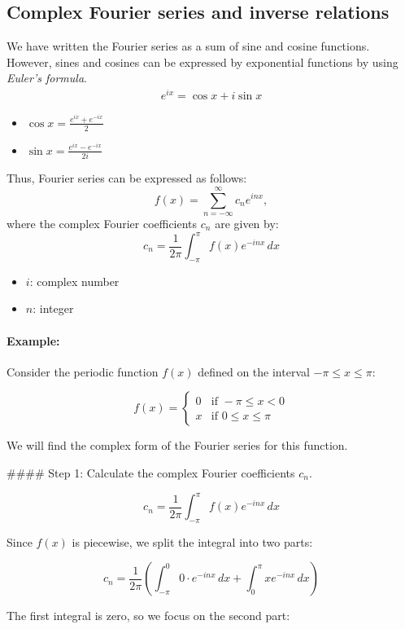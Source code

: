 \subsection{Complex Fourier series and inverse relations}

We have written the Fourier series as a sum of sine and cosine functions. However, sines and cosines can be expressed by exponential functions by using \textit{Euler's formula}. 
\begin{align}
	e^{ix}=\cos x+i\sin x
	\label{eq:euler_formula}
\end{align}
\begin{itemize}
	\item $\cos x=\frac{e^{ix}+e^{-ix}}{2}$
	\item $\sin x=\frac{e^{ix}-e^{-ix}}{2i}$
\end{itemize}
Thus, Fourier series can be expressed as follows:
$$f(x) = \sum_{n=-\infty}^{\infty} c_n e^{inx},$$
where the complex Fourier coefficients \( c_n \) are given by:
\[ c_n = \frac{1}{2\pi} \int_{-\pi}^{\pi} f(x) e^{-inx} \, dx \]

\begin{itemize}
	\item $i$: complex number
	\item $n$: integer
\end{itemize}

\paragraph{Example: }Consider the periodic function \( f(x) \) defined on the interval \( -\pi \leq x \leq \pi \):

\[ f(x) = \begin{cases} 
0 & \text{if } -\pi \leq x < 0 \\
x & \text{if } 0 \leq x \leq \pi 
\end{cases} \]

We will find the complex form of the Fourier series for this function.

#### Step 1: Calculate the complex Fourier coefficients \( c_n \).

\[ c_n = \frac{1}{2\pi} \int_{-\pi}^{\pi} f(x) e^{-inx} \, dx \]

Since \( f(x) \) is piecewise, we split the integral into two parts:

\[ c_n = \frac{1}{2\pi} \left( \int_{-\pi}^{0} 0 \cdot e^{-inx} \, dx + \int_{0}^{\pi} x e^{-inx} \, dx \right) \]

The first integral is zero, so we focus on the second part:

